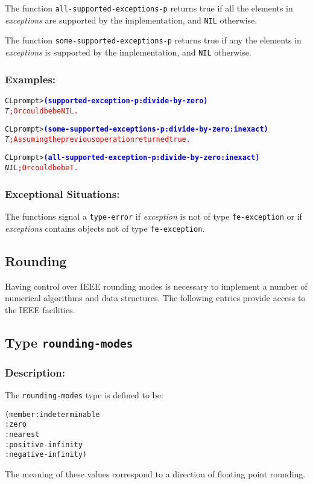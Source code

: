 \documentclass[fleqn]{article}
\newcommand{\code}[1]{\texttt{#1}}
\newcommand{\varname}[1]{\textit{#1}}
\newcommand{\codeprompt}[1]{\textcolor{blue}{\textbf{#1}}}
\newcommand{\DDictionaryItem}[1]{\vspace*{6pt}\noindent\hrulefill\vspace*{-9pt}\subsection*{#1}}
\newcommand{\DExamples}{\subsubsection*{Examples:}}
\begin{document}
The function \code{all-supported-exceptions-p} returns true if all the
elements in \varname{exceptions} are supported by the implementation,
and \code{NIL} otherwise.

The function \code{some-supported-exceptions-p} returns true if any the
elements in \varname{exceptions} is supported by the implementation,
and \code{NIL} otherwise.

\DExamples{}

\begin{alltt}
CL prompt> \codeprompt{(supported-exception-p :divide-by-zero)}
\textit{T} \textcolor{red}{; Or could be be NIL.}

CL prompt> \codeprompt{(some-supported-exceptions-p :divide-by-zero :inexact)}
\textit{T} \textcolor{red}{; Assuming the previous operation returned true.}

CL prompt> \codeprompt{(all-supported-exception-p :divide-by-zero :inexact)}
\textit{NIL} \textcolor{red}{; Or could be be T.}
\end{alltt}

\subsubsection*{Exceptional Situations:}

The functions signal a \code{type-error} if \varname{exception}
is not of type \code{fe-exception} or if \varname{exceptions} contains
objects not of type \code{fe-exception}.









\subsection{Rounding}

Having control over IEEE rounding modes is necessary to implement a
number of numerical algorithms and data structures. The following
entries provide access to the IEEE facilities.


\DDictionaryItem{Type \code{rounding-modes}}

\subsubsection{Description:}

The \code{rounding-modes} type is defined to be:
\begin{alltt}
(member :indeterminable
        :zero
        :nearest
        :positive-infinity
        :negative-infinity)
\end{alltt}
The meaning of these values correspond to a direction of floating
point rounding.
\end{document}
